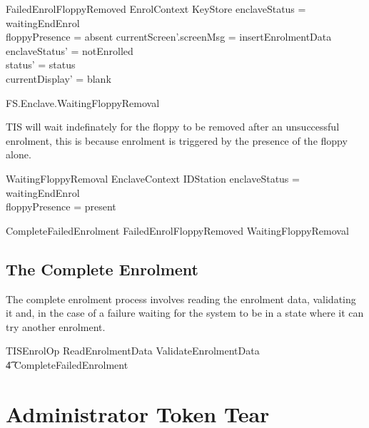 \begin{schema}{FailedEnrolFloppyRemoved}
        EnrolContext
\also
        \Xi KeyStore
\where
        enclaveStatus = waitingEndEnrol
\\      floppyPresence = absent
\also
        currentScreen'.screenMsg = insertEnrolmentData
\also
        enclaveStatus' = notEnrolled
\\      status' = status
\\      currentDisplay' = blank
\end{schema}

\begin{traceunit}{FS.Enclave.WaitingFloppyRemoval}
\end{traceunit}

TIS will wait indefinately for the floppy to be removed after an
unsuccessful enrolment, this is because enrolment is triggered by the
presence of the floppy alone.

\begin{schema}{WaitingFloppyRemoval}
        EnclaveContext
\also
        \Xi IDStation
\where
        enclaveStatus = waitingEndEnrol
\\      floppyPresence = present
\end{schema}

\begin{zed}
        CompleteFailedEnrolment  FailedEnrolFloppyRemoved  
         \lor WaitingFloppyRemoval
\end{zed}

\subsection{The Complete Enrolment}

The complete enrolment process involves reading the enrolment data,
validating it and, in the case of a failure waiting for the system to
be in a state where it can try another enrolment.

\begin{zed}
        TISEnrolOp  ReadEnrolmentData \lor
ValidateEnrolmentData 
\\      \t4 \lor CompleteFailedEnrolment
\end{zed}

\section{Administrator Token Tear}

